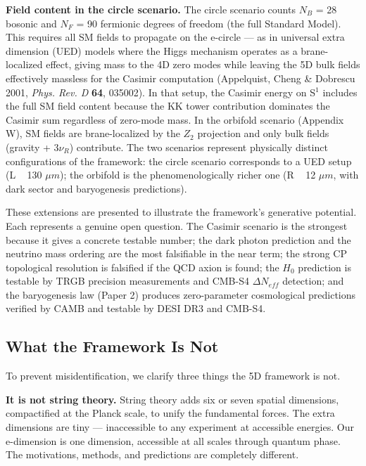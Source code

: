 \documentclass[aps,prd,preprint,superscriptaddress,longbibliography,floatfix]{revtex4-2}
\theoremstyle{remark}
\begin{document}
\textbf{Field content in the circle scenario.} The circle scenario counts $N_B$ = 28 bosonic and $N_F$ = 90 fermionic degrees of freedom (the full Standard Model). This requires all SM fields to propagate on the e-circle --- as in universal extra dimension (UED) models where the Higgs mechanism operates as a brane-localized effect, giving mass to the 4D zero modes while leaving the 5D bulk fields effectively massless for the Casimir computation (Appelquist, Cheng \& Dobrescu 2001, \textit{Phys. Rev. D} \textbf{64}, 035002). In that setup, the Casimir energy on S$^{1}$ includes the full SM field content because the KK tower contribution dominates the Casimir sum regardless of zero-mode mass. In the orbifold scenario (Appendix W), SM fields are brane-localized by the $Z_{2}$ projection and only bulk fields (gravity + $3\nu_R$) contribute. The two scenarios represent physically distinct configurations of the framework: the circle scenario corresponds to a UED setup (L ~ 130 $\mu m$); the orbifold is the phenomenologically richer one (R ~ 12 $\mu m$, with dark sector and baryogenesis predictions).

These extensions are presented to illustrate the framework's generative potential. Each represents a genuine open question. The Casimir scenario is the strongest because it gives a concrete testable number; the dark photon prediction and the neutrino mass ordering are the most falsifiable in the near term; the strong CP topological resolution is falsified if the QCD axion is found; the $H_{0}$ prediction is testable by TRGB precision measurements and CMB-S4 $\Delta N_{eff}$ detection; and the baryogenesis law (Paper 2) produces zero-parameter cosmological predictions verified by CAMB and testable by DESI DR3 and CMB-S4.



\subsection{What the Framework Is Not}

To prevent misidentification, we clarify three things the 5D framework is not.

\textbf{It is not string theory.} String theory adds six or seven spatial dimensions, compactified at the Planck scale, to unify the fundamental forces. The extra dimensions are tiny --- inaccessible to any experiment at accessible energies. Our e-dimension is one dimension, accessible at all scales through quantum phase. The motivations, methods, and predictions are completely different.
\end{document}
